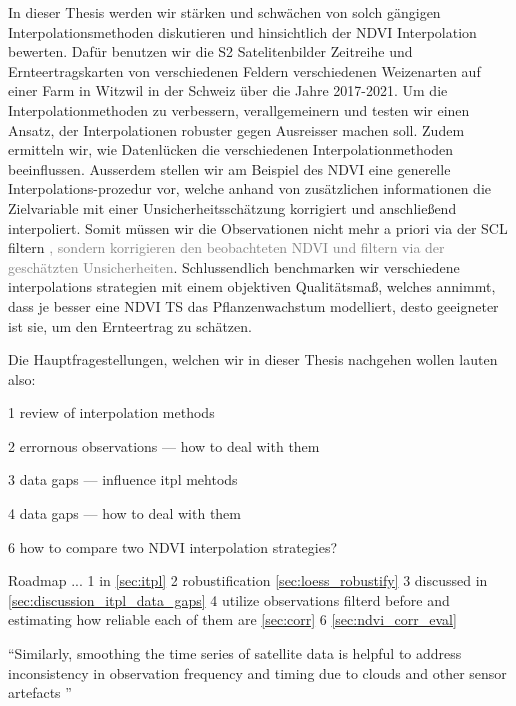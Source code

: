 In dieser Thesis werden wir stärken und schwächen von solch gängigen Interpolationsmethoden diskutieren und hinsichtlich der NDVI Interpolation bewerten. Dafür benutzen wir die S2 Satelitenbilder Zeitreihe und Ernteertragskarten von verschiedenen Feldern verschiedenen Weizenarten auf einer Farm in Witzwil in der Schweiz über die Jahre 2017-2021.
Um die Interpolationmethoden zu verbessern, verallgemeinern und testen wir einen Ansatz, der Interpolationen robuster gegen Ausreisser machen soll. Zudem ermitteln wir, wie Datenlücken die verschiedenen Interpolationmethoden beeinflussen. Ausserdem stellen wir am Beispiel des NDVI eine generelle Interpolations-prozedur vor, welche anhand von zusätzlichen informationen die Zielvariable mit einer Unsicherheitsschätzung korrigiert und anschließend interpoliert. Somit müssen wir die Observationen nicht mehr a priori via der SCL filtern \textcolor{gray}{, sondern korrigieren den beobachteten NDVI und filtern via der geschätzten Unsicherheiten}. Schlussendlich benchmarken wir verschiedene interpolations strategien mit einem objektiven Qualitätsmaß, welches annimmt, dass je besser eine NDVI TS das Pflanzenwachstum modelliert, desto geeigneter ist sie, um den Ernteertrag zu schätzen. 

Die Hauptfragestellungen, welchen wir in dieser Thesis nachgehen wollen lauten also:
\begin{Nenumerate}
    \item 1 review of interpolation methods
    \item 2 errornous observations --- how to deal with them
    \item 3 data gaps --- influence itpl mehtods 
    \item 4 data gaps --- how to deal with them
    \item 6 how to compare two NDVI interpolation strategies?
\end{Nenumerate}

Roadmap ...
1 in \ref{sec:itpl}
2 robustification \ref{sec:loess_robustify}
3 discussed in \ref{sec:discussion_itpl_data_gaps}
4 utilize observations filterd before and estimating how reliable each of them are \ref{sec:corr}
6 \ref{sec:ndvi_corr_eval}


``Similarly, smoothing the time series of satellite data is helpful to address inconsistency in observation frequency and timing due to clouds and other sensor artefacts \cite{skakunWinterWheatYield2019}''








